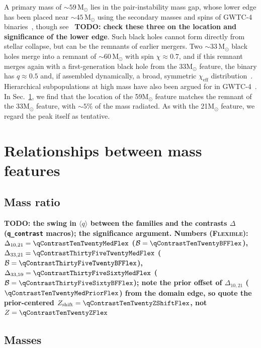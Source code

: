 \documentclass[%
 reprint,
 amsmath,amssymb,
 aps,
 prl,
 nofootinbib,nobibnotes,
]{revtex4-2}
\newcommand{\Msun}{\ensuremath{\mathrm{M}_{\odot}}}
\newcommand{\chieff}{\ensuremath{\chi_{\mathrm{eff}}}}
\newcommand{\todo}[1]{{\color{Blue}\bf TODO: #1}}
\newcommand{\flexiblespins}{\textsc{Flexible}\xspace}
\newcommand{\featTen}{10\xspace}
\newcommand{\featTwenty}{21\xspace}
\newcommand{\featThirtyFive}{33\xspace}
\newcommand{\featSixty}{59\xspace}
\begin{document}
A primary mass of $\sim \featSixty\,\Msun$ lies in the pair-instability mass gap, whose lower edge has been placed near $\sim 45\,\Msun$ using the secondary masses and spins of \ac{GWTC-4} binaries~\cite{Tong:2025wpz, Antonini:2025ilj}, though see~\cite{Ray:2025xti} \todo{check these three on the location and significance of the lower edge}. Such black holes cannot form directly from stellar collapse, but can be the remnants of earlier mergers. Two $\sim \featThirtyFive\,\Msun$ black holes merge into a remnant of $\sim 60\,\Msun$ with spin $\chi \approx 0.7$, and if this remnant merges again with a first-generation black hole from the \featThirtyFive $\Msun$ feature, the binary has $q \approx 0.5$ and, if assembled dynamically, a broad, symmetric $\chieff$ distribution~\cite{Rodriguez:2019huv, Kimball:2020opk, Gerosa:2021mno, Antonini:2024het}. Hierarchical subpopulations at high mass have also been argued for in \ac{GWTC-4}~\cite{Plunkett:2026pxt, Li:2025iux}. In Sec.~\ref{sec: relationships}, we find that the location of the \featSixty $\Msun$ feature matches the remnant of the \featThirtyFive $\Msun$ feature, with $\sim 5\%$ of the mass radiated. As with the \featTwenty $\Msun$ feature, we regard the peak itself as tentative.

\section{Relationships between mass features}
\label{sec: relationships}

\subsection{Mass ratio}

\todo{the swing in $\langle q \rangle$ between the families and the contrasts $\Delta$ (\texttt{q\_contrast} macros); the significance argument. Numbers (\flexiblespins): $\Delta_{\featTen,\featTwenty} = \qContrastTenTwentyMedFlex$ ($\mathcal{B} = \qContrastTenTwentyBFFlex$), $\Delta_{\featThirtyFive,\featTwenty} = \qContrastThirtyFiveTwentyMedFlex$ ($\mathcal{B} = \qContrastThirtyFiveTwentyBFFlex$), $\Delta_{\featThirtyFive,\featSixty} = \qContrastThirtyFiveSixtyMedFlex$ ($\mathcal{B} = \qContrastThirtyFiveSixtyBFFlex$); note the prior offset of $\Delta_{\featTen,\featTwenty}$ ($\qContrastTenTwentyMedPriorFlex$) from the domain edge, so quote the prior-centered $Z_{\rm shift} = \qContrastTenTwentyZShiftFlex$, not $Z = \qContrastTenTwentyZFlex$}

\subsection{Masses}
\end{document}
